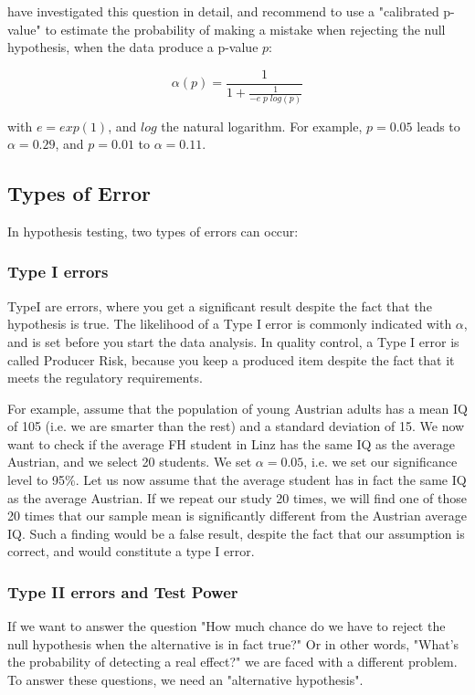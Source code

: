 \cite{sellke2001} have investigated this question in detail, and recommend to use a "calibrated p-value" to estimate the probability of making a mistake when rejecting the null hypothesis, when the data produce a p-value $p$:

\begin{equation}\label{eq:pFallacy}
    \alpha(p)= \frac{1}{1 + \frac{1}{-e \; p \; log(p)}}
\end{equation}

with $e=exp(1)$, and $log$ the natural logarithm. For example, $p=0.05$ leads to $\alpha=0.29$, and $p=0.01$ to $\alpha=0.11$.

\subsection{Types of Error}
In hypothesis testing, two types of errors can occur:

\subsubsection{Type I errors}  
\gls{TypeI} are errors, where you get a significant result despite the fact that the hypothesis is true. The likelihood of a Type I error is commonly indicated with $\alpha$, and is set before you start the data analysis. In quality control, a Type I error is called Producer Risk, because you keep a produced item despite the fact that it meets the regulatory requirements.

For example, assume that the population of young Austrian adults has a mean IQ of 105 (i.e. we are smarter than the rest) and a standard deviation of 15. We now want to check if the average FH student in Linz has the same IQ as the average Austrian, and we select 20 students. We set $\alpha=0.05$, i.e. we set our significance level to 95\%.
Let us now assume that the average student has in fact the same IQ as the average Austrian. If we repeat our study 20 times, we will find one of those 20 times that our sample mean is significantly different from the Austrian average IQ. Such a finding would be a false result, despite the fact that our assumption is correct, and would constitute a type I error.

\subsubsection{Type II errors and Test Power}
If we want to answer the question "How much chance do we have to reject the null hypothesis when the alternative is in fact true?" Or in other words, "What’s the probability of detecting a real effect?" we are faced with a different problem. To answer these questions, we need an "alternative hypothesis".

